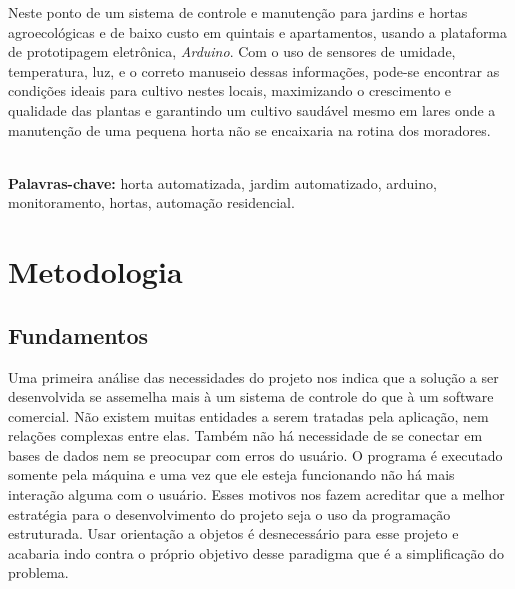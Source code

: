 \documentclass[a4paper,12pt]{article}
\begin{document}
Neste ponto  de um sistema de controle e manutenção para jardins e hortas agroecológicas e de baixo custo em quintais e apartamentos, usando a plataforma de prototipagem eletrônica, \textit{Arduino}. Com o uso de sensores de umidade, temperatura, luz, e o correto manuseio dessas informações, pode-se encontrar as condições ideais para cultivo nestes locais, maximizando o crescimento e qualidade das plantas e garantindo um cultivo saudável mesmo em lares onde a manutenção de uma pequena horta não se encaixaria na rotina dos moradores.

\textbf{\\Palavras-chave:} horta automatizada, jardim automatizado, arduino, monitoramento, hortas, automação residencial.


\newpage
\section{Metodologia}
\subsection{Fundamentos}

Uma primeira análise das necessidades do projeto nos indica que a solução a ser desenvolvida se assemelha mais à um sistema de controle do que à um software comercial. Não existem muitas entidades a serem tratadas pela aplicação, nem relações complexas entre elas. Também não há necessidade de se conectar em bases de dados nem se preocupar com erros do usuário. O programa é executado somente pela máquina e uma vez que ele esteja funcionando não há mais interação alguma com o usuário. Esses motivos nos fazem acreditar que a melhor estratégia para o desenvolvimento do projeto seja o uso da programação estruturada. Usar orientação a objetos é desnecessário para esse projeto e acabaria indo contra o próprio objetivo desse paradigma que é a simplificação do problema.
\end{document}
